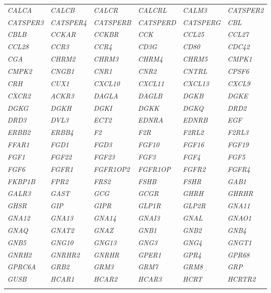 {\begin{longtable}{>{\em}l>{\em}l>{\em}l>{\em}l>{\em}l>{\em}l}
  \rowcolor{black!10} 
  CALCA & CALCB & CALCR & CALCRL & CALM3 & CATSPER2 \\ 
  \rowcolor{black!5} 
  CATSPER3 & CATSPER4 & CATSPERB & CATSPERD & CATSPERG & CBL \\ 
  \rowcolor{black!10} 
  CBLB & CCKAR & CCKBR & CCK & CCL25 & CCL27 \\ 
  \rowcolor{black!5} 
  CCL28 & CCR3 & CCR4 & CD3G & CD80 & CDC42 \\ 
  \rowcolor{black!10} 
  CGA & CHRM2 & CHRM3 & CHRM4 & CHRM5 & CMPK1 \\ 
  \rowcolor{black!5} 
  CMPK2 & CNGB1 & CNR1 & CNR2 & CNTRL & CPSF6 \\ 
  \rowcolor{black!10} 
  CRH & CUX1 & CXCL10 & CXCL11 & CXCL13 & CXCL9 \\ 
  \rowcolor{black!5} 
  CXCR2 & ACKR3 & DAGLA & DAGLB & DGKB & DGKE \\ 
  \rowcolor{black!10} 
  DGKG & DGKH & DGKI & DGKK & DGKQ & DRD2 \\ 
  \rowcolor{black!5} 
  DRD3 & DVL3 & ECT2 & EDNRA & EDNRB & EGF \\ 
  \rowcolor{black!10} 
  ERBB2 & ERBB4 & F2 & F2R & F2RL2 & F2RL3 \\ 
  \rowcolor{black!5} 
  FFAR1 & FGD1 & FGD3 & FGF10 & FGF16 & FGF19 \\ 
  \rowcolor{black!10} 
  FGF1 & FGF22 & FGF23 & FGF3 & FGF4 & FGF5 \\ 
  \rowcolor{black!5} 
  FGF6 & FGFR1 & FGFR1OP2 & FGFR1OP & FGFR2 & FGFR4 \\ 
  \rowcolor{black!10} 
  FKBP1B & FPR2 & FRS2 & FSHB & FSHR & GAB1 \\ 
  \rowcolor{black!5} 
  GALR3 & GAST & GCG & GCGR & GHRH & GHRHR \\ 
  \rowcolor{black!10} 
  GHSR & GIP & GIPR & GLP1R & GLP2R & GNA11 \\ 
  \rowcolor{black!5} 
  GNA12 & GNA13 & GNA14 & GNAI3 & GNAL & GNAO1 \\ 
  \rowcolor{black!10} 
  GNAQ & GNAT2 & GNAZ & GNB1 & GNB2 & GNB4 \\ 
  \rowcolor{black!5} 
  GNB5 & GNG10 & GNG13 & GNG3 & GNG4 & GNGT1 \\ 
  \rowcolor{black!10} 
  GNRH2 & GNRHR2 & GNRHR & GPER1 & GPR4 & GPR68 \\ 
  \rowcolor{black!5} 
  GPRC6A & GRB2 & GRM3 & GRM7 & GRM8 & GRP \\ 
  \rowcolor{black!10} 
  GUSB & HCAR1 & HCAR2 & HCAR3 & HCRT & HCRTR2 \\ 
  \rowcolor{black!5} 

\end{longtable}}
